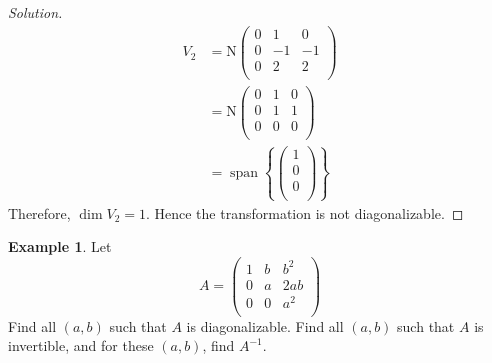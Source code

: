 \documentclass[fleqn, a4paper, 12pt]{article}
\DeclareMathOperator{\vspan}{\mathrm{span}} %
\theoremstyle{definition}
\newtheorem{example}{Example} %
\theoremstyle{theorem}
\theoremstyle{remark}
\newcommand{\N}{\mathrm{N}}
\newenvironment{solution} %
	{\begin{proof}[Solution]\let\qed\relax}
	{\end{proof}}
\numberwithin{corollary}{theorem}
\numberwithin{equation}{theorem}
\begin{document}
\begin{solution}
	\begin{align*}
		V_2 &= \N
			\begin{pmatrix}
				0 & 1 & 0\\
				0 & -1 & -1\\
				0 & 2 & 2\\
			\end{pmatrix}\\
		&= \N
			\begin{pmatrix}
				0 & 1 & 0\\
				0 & 1 & 1\\
				0 & 0 & 0\\
			\end{pmatrix}\\
		&= \vspan
			\left\lbrace
				\begin{pmatrix}
					1\\
					0\\
					0\\
				\end{pmatrix}
			\right\rbrace
	\end{align*}
	Therefore, $\dim V_2 = 1$. Hence the transformation is not diagonalizable.
\end{solution}

\begin{example}
	Let 
	\begin{equation*}
		A =
			\begin{pmatrix}
				1 & b & b^2\\
				0 & a & 2ab\\
				0 & 0 & a^2\\
			\end{pmatrix}
	\end{equation*}
	Find all $(a,b)$ such that $A$ is diagonalizable. Find all $(a,b)$ such that $A$ is invertible, and for these $(a,b)$, find $A^{-1}$.
\end{example}
\end{document}
